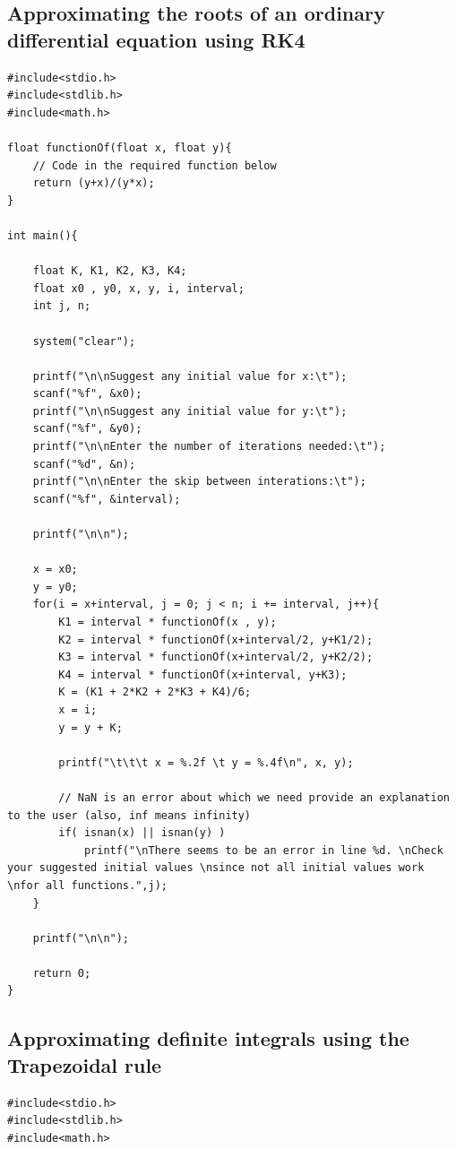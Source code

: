\documentclass[11pt,oneside]{article}
\newcommand{\stoptocentries}{\renewcommand{\addcontentsline}[3]{}}
\begin{document}
{{{{{{{{{{{{\clearpage
\stoptocentries
\subsection{Approximating the roots of an ordinary differential equation using RK4}
\begin{lstlisting}[firstnumber=1]
#include<stdio.h>
#include<stdlib.h>
#include<math.h>

float functionOf(float x, float y){
    // Code in the required function below
    return (y+x)/(y*x);
}

int main(){
    
    float K, K1, K2, K3, K4;
    float x0 , y0, x, y, i, interval;
    int j, n;
    
    system("clear");
    
    printf("\n\nSuggest any initial value for x:\t");
    scanf("%f", &x0);
    printf("\n\nSuggest any initial value for y:\t");
    scanf("%f", &y0);
    printf("\n\nEnter the number of iterations needed:\t");
    scanf("%d", &n);
    printf("\n\nEnter the skip between interations:\t");
    scanf("%f", &interval);
    
    printf("\n\n");
    
    x = x0;
    y = y0;
    for(i = x+interval, j = 0; j < n; i += interval, j++){
        K1 = interval * functionOf(x , y);
        K2 = interval * functionOf(x+interval/2, y+K1/2);
        K3 = interval * functionOf(x+interval/2, y+K2/2);
        K4 = interval * functionOf(x+interval, y+K3);
        K = (K1 + 2*K2 + 2*K3 + K4)/6;
        x = i;
        y = y + K;
        
        printf("\t\t\t x = %.2f \t y = %.4f\n", x, y);
       
        // NaN is an error about which we need provide an explanation to the user (also, inf means infinity)
        if( isnan(x) || isnan(y) )
            printf("\nThere seems to be an error in line %d. \nCheck your suggested initial values \nsince not all initial values work \nfor all functions.",j);
    }
    
    printf("\n\n");
    
    return 0;
}
\end{lstlisting}

\clearpage
\stoptocentries
\subsection{Approximating definite integrals using the Trapezoidal rule}
\begin{lstlisting}[firstnumber=1]
#include<stdio.h>
#include<stdlib.h>
#include<math.h>


\end{lstlisting}}}}}}}}}}}}}
\end{document}
